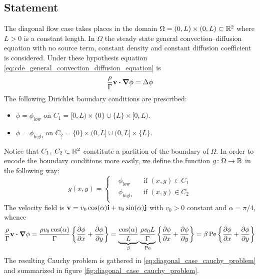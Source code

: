 
\subsection{Statement}

The diagonal flow case takes places in the domain $\Omega = (0,L) \times (0,L) \subset \mathbb{R}^2$ where $L > 0$ is a constant length. In $\Omega$ the steady state general convection--diffusion equation with no source term, constant density and constant diffusion coefficient is considered. Under these hypothesis equation \eqref{eq:cde_general_convection_diffusion_equation} is
\begin{equation} \label{eq:diagcase_statement_pde1}
	\frac{\rho}{\Gamma} \vb{v} \vdot \grad{\phi} = \Delta{\phi}
\end{equation}
The following Dirichlet boundary conditions are prescribed:
\begin{itemize}[topsep=0pt]
	\item $\phi = \phi_\text{low}$ on $C_1 = [0,L) \times \{ 0 \} \cup \{ L \} \times [0,L)$.
	\item $\phi = \phi_\text{high}$ on $C_2 = \{ 0 \} \times (0,L] \cup (0,L] \times \{ L \}$.
\end{itemize}
Notice that $C_1, \ C_2 \subset \mathbb{R}^2$ constitute a partition of the boundary of $\Omega$. In order to encode the boundary conditions more easily, we define the function $g \colon \Omega \rightarrow \mathbb{R}$ in the following way:
\begin{equation}
	g(x,y) =
	\left\{
	\begin{aligned}
		&\phi_\text{low} 	& &\text{if } (x,y) \in C_1 \\
		&\phi_\text{high} 	& &\text{if } (x,y) \in C_2 \\
	\end{aligned}
	\right.
\end{equation}
The velocity field is $\vb{v} = v_0 \cos(\alpha) \vb{i} + v_0 \sin(\alpha) \vb{j}$ with $v_0 > 0$ constant and $\alpha = \pi / 4$, whence
\begin{align}
	\frac{\rho}{\Gamma} \vb{v} \vdot \grad{\phi} = 
	\frac{\rho v_0 \cos(\alpha)}{\Gamma} \left\{ \pdv{\phi}{x} + \pdv{\phi}{y} \right\} = 
	\underbrace{\frac{\cos(\alpha)}{L}}_{\beta} 
	\underbrace{\frac{\rho v_0 L}{\Gamma}}_{\mathrm{Pe}} 
	\left\{ \pdv{\phi}{x} + \pdv{\phi}{y} \right\} = 
	\beta \, \mathrm{Pe} \left\{ \pdv{\phi}{x} + \pdv{\phi}{y} \right\}
\end{align}
The resulting Cauchy problem is gathered in \eqref{eq:diagonal_case_cauchy_problem} and summarized in figure \ref{fig:diagonal_case_cauchy_problem}.
